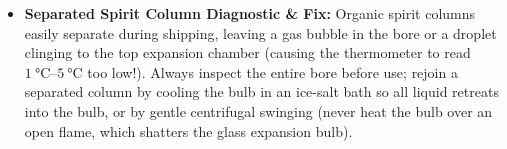 \begin{itemize}
  where $k_g = \beta_{\mathrm{app}} \approx \SI{0.00104}{\per\celsius}$ for organic spirit-in-glass thermometers and $k_g \approx \SI{0.00016}{\per\celsius}$ for mercury/Galinstan-in-borosilicate-glass thermometers .
  \item \textbf{Separated Spirit Column Diagnostic \& Fix:}  Organic spirit columns easily separate during shipping, leaving a gas bubble in the bore or a droplet clinging to the top expansion chamber (causing the thermometer to read $\SIrange{1}{5}{\celsius}$ too low!). Always inspect the entire bore before use; rejoin a separated column by cooling the bulb in an ice-salt bath so all liquid retreats into the bulb, or by gentle centrifugal swinging (never heat the bulb over an open flame, which shatters the glass expansion bulb).
\end{itemize}

